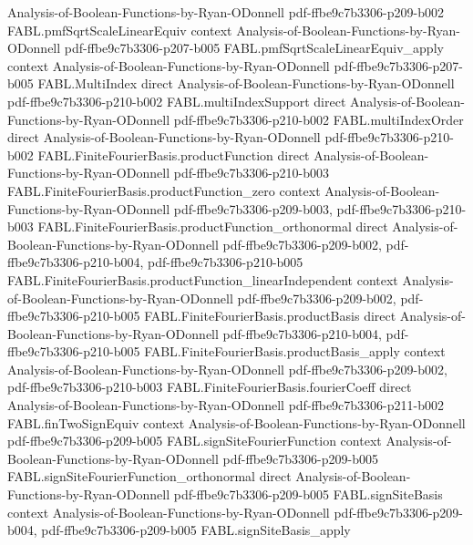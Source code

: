 \begin{theorem}
  {Analysis-of-Boolean-Functions-by-Ryan-ODonnell}
  {pdf-ffbe9c7b3306-p209-b002}
\proofstep
  {FABL.pmfSqrtScaleLinearEquiv}
  {context}
  {Analysis-of-Boolean-Functions-by-Ryan-ODonnell}
  {pdf-ffbe9c7b3306-p207-b005}
\proofstep
  {FABL.pmfSqrtScaleLinearEquiv_apply}
  {context}
  {Analysis-of-Boolean-Functions-by-Ryan-ODonnell}
  {pdf-ffbe9c7b3306-p207-b005}
\proofstep
  {FABL.MultiIndex}
  {direct}
  {Analysis-of-Boolean-Functions-by-Ryan-ODonnell}
  {pdf-ffbe9c7b3306-p210-b002}
\proofstep
  {FABL.multiIndexSupport}
  {direct}
  {Analysis-of-Boolean-Functions-by-Ryan-ODonnell}
  {pdf-ffbe9c7b3306-p210-b002}
\proofstep
  {FABL.multiIndexOrder}
  {direct}
  {Analysis-of-Boolean-Functions-by-Ryan-ODonnell}
  {pdf-ffbe9c7b3306-p210-b002}
\proofstep
  {FABL.FiniteFourierBasis.productFunction}
  {direct}
  {Analysis-of-Boolean-Functions-by-Ryan-ODonnell}
  {pdf-ffbe9c7b3306-p210-b003}
\proofstep
  {FABL.FiniteFourierBasis.productFunction_zero}
  {context}
  {Analysis-of-Boolean-Functions-by-Ryan-ODonnell}
  {pdf-ffbe9c7b3306-p209-b003,
    pdf-ffbe9c7b3306-p210-b003}
\proofstep
  {FABL.FiniteFourierBasis.productFunction_orthonormal}
  {direct}
  {Analysis-of-Boolean-Functions-by-Ryan-ODonnell}
  {pdf-ffbe9c7b3306-p209-b002,
    pdf-ffbe9c7b3306-p210-b004,
    pdf-ffbe9c7b3306-p210-b005}
\proofstep
  {FABL.FiniteFourierBasis.productFunction_linearIndependent}
  {context}
  {Analysis-of-Boolean-Functions-by-Ryan-ODonnell}
  {pdf-ffbe9c7b3306-p209-b002,
    pdf-ffbe9c7b3306-p210-b005}
\proofstep
  {FABL.FiniteFourierBasis.productBasis}
  {direct}
  {Analysis-of-Boolean-Functions-by-Ryan-ODonnell}
  {pdf-ffbe9c7b3306-p210-b004,
    pdf-ffbe9c7b3306-p210-b005}
\proofstep
  {FABL.FiniteFourierBasis.productBasis_apply}
  {context}
  {Analysis-of-Boolean-Functions-by-Ryan-ODonnell}
  {pdf-ffbe9c7b3306-p209-b002,
    pdf-ffbe9c7b3306-p210-b003}
\proofstep
  {FABL.FiniteFourierBasis.fourierCoeff}
  {direct}
  {Analysis-of-Boolean-Functions-by-Ryan-ODonnell}
  {pdf-ffbe9c7b3306-p211-b002}
\proofstep
  {FABL.finTwoSignEquiv}
  {context}
  {Analysis-of-Boolean-Functions-by-Ryan-ODonnell}
  {pdf-ffbe9c7b3306-p209-b005}
\proofstep
  {FABL.signSiteFourierFunction}
  {context}
  {Analysis-of-Boolean-Functions-by-Ryan-ODonnell}
  {pdf-ffbe9c7b3306-p209-b005}
\proofstep
  {FABL.signSiteFourierFunction_orthonormal}
  {direct}
  {Analysis-of-Boolean-Functions-by-Ryan-ODonnell}
  {pdf-ffbe9c7b3306-p209-b005}
\proofstep
  {FABL.signSiteBasis}
  {context}
  {Analysis-of-Boolean-Functions-by-Ryan-ODonnell}
  {pdf-ffbe9c7b3306-p209-b004,
    pdf-ffbe9c7b3306-p209-b005}
\proofstep
  {FABL.signSiteBasis_apply}

\end{theorem}
